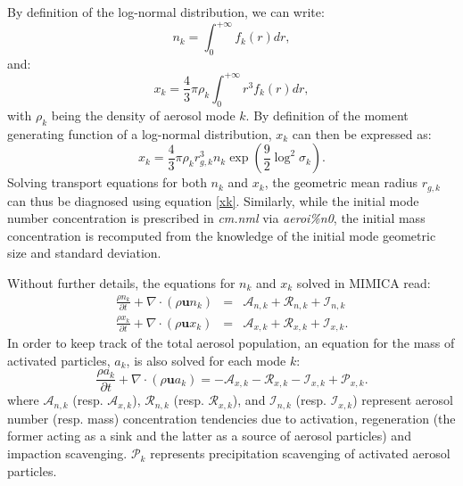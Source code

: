 \documentclass[12pt,A4,french]{article}
\begin{document}
By definition of the log-normal distribution, we can write:
\begin{equation}
    n_k = \int_{0}^{+\infty} f_k\left(r\right) dr,
\end{equation}
and:
\begin{equation}
    x_k = \frac{4}{3}\pi\rho_k\int_{0}^{+\infty} r^3 f_k\left(r\right) dr,
\end{equation}
with $\rho_k$ being the density of aerosol mode $k$. By definition of the moment generating function of a log-normal distribution, $x_k$ can then be expressed as:
\begin{equation}
    x_k = \frac{4}{3}\pi\rho_k r^3_{g,k}n_k\exp\left(\frac{9}{2}\log^2\sigma_k\right).
    \label{xk}
\end{equation}
Solving transport equations for both $n_k$ and $x_k$, the geometric mean radius $r_{g,k}$ can thus be diagnosed using equation \ref{xk}. Similarly, while the initial mode number concentration is prescribed in {\it cm.nml} via {\it aeroi\%n0}, the initial mass concentration is recomputed from the knowledge of the initial mode geometric size and standard deviation.

Without further details, the equations for $n_k$ and $x_k$ solved in MIMICA read:
\begin{eqnarray}
    \frac{\rho n_k}{\partial t} + \nabla\cdot\left(\rho\mathbf{u}n_k\right) &=& \mathcal{A}_{n,k} + \mathcal{R}_{n,k} + \mathcal{I}_{n,k} \\
    \frac{\rho x_k}{\partial t} + \nabla\cdot\left(\rho\mathbf{u}x_k\right) &=& \mathcal{A}_{x,k} + \mathcal{R}_{x,k} + \mathcal{I}_{x,k}.
\end{eqnarray}
In order to keep track of the total aerosol population, an equation for the mass of activated particles, $a_k$, is also solved for each mode $k$:
\begin{equation}
    \frac{\rho a_k}{\partial t} + \nabla\cdot\left(\rho\mathbf{u} a_k\right) = - \mathcal{A}_{x,k} - \mathcal{R}_{x,k} - \mathcal{I}_{x,k} + \mathcal{P}_{x,k}.
\end{equation}
where $\mathcal{A}_{n,k}$ (resp. $\mathcal{A}_{x,k}$), $\mathcal{R}_{n,k}$ (resp. $\mathcal{R}_{x,k}$), and $\mathcal{I}_{n,k}$ (resp. $\mathcal{I}_{x,k}$) represent aerosol number (resp. mass) concentration tendencies due to activation, regeneration (the former acting as a sink and the latter as a source of aerosol particles) and impaction scavenging. $\mathcal{P}_{k}$ represents precipitation scavenging of activated aerosol particles.
\end{document}

